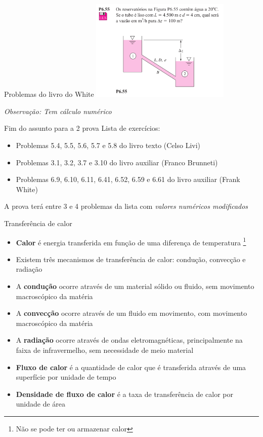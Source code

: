 \documentclass[t,%
brazilian,%
11pt,%
aspectratio=169,%
table%
]{beamer}
\newcommand{\esima}{\textordfeminine }
\begin{document}
\begin{frame}{Problemas do livro do White}
    \includegraphics[width=0.5\textwidth]{images/Captura de tela de 2025-05-13 17-02-19.png}

    \vspace{\fill}
    \tiny{\textit{Observação: Tem cálculo numérico}}
\end{frame}


\begin{frame}{Fim do assunto para a 2\esima{} prova}
    Lista de exercícios:
    \begin{itemize}
        \item Problemas 5.4, 5.5, 5.6, 5.7 e 5.8 do livro texto (Celso Livi)
        \item Problemas 3.1, 3.2, 3.7 e 3.10  do livro auxiliar (Franco Brunneti)
        \item Problemas 6.9, 6.10, 6.11, 6.41, 6.52, 6.59 e 6.61 do livro auxiliar (Frank White)
    \end{itemize}

    A prova terá entre 3 e 4 problemas da lista com \textit{valores numéricos modificados}
\end{frame}

\begin{frame}{Transferência de calor}
    \begin{itemize}
        \item \textbf{Calor} é energia transferida em função de uma diferença de
            temperatura \footnote{Não se pode ter ou armazenar calor}
        \item Existem três mecanismos de transferência de calor: condução, convecção e radiação
        \item A \textbf{condução} ocorre através de um material sólido ou fluido, sem movimento macroscópico da matéria
        \item A \textbf{convecção} ocorre através de um fluido em movimento, com movimento macroscópico da matéria
        \item A \textbf{radiação} ocorre através de ondas eletromagnéticas, principalmente na faixa de infravermelho,
            sem necessidade de meio material
            \pause 
        \item \textbf{Fluxo de calor} é a quantidade de calor que é transferida através de uma superfície por unidade de tempo
        \item \textbf{Densidade de fluxo de calor} é a taxa de transferência de calor por unidade de área
    \end{itemize}
\end{frame}
\end{document}
